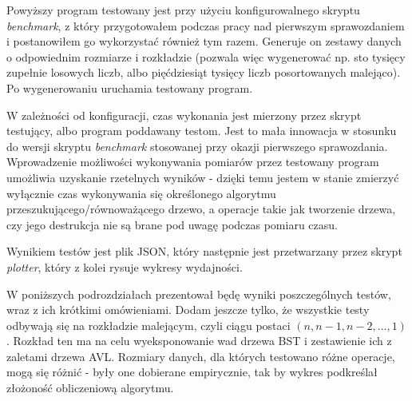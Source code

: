\documentclass[12pt]{article}
\begin{document}
        Powyższy program testowany jest przy użyciu konfigurowalnego skryptu \textit{benchmark}, z który przygotowałem podczas pracy nad pierwszym sprawozdaniem i postanowiłem go wykorzystać również tym razem. Generuje on zestawy danych o odpowiednim rozmiarze i rozkładzie (pozwala więc wygenerować np. sto tysięcy zupełnie losowych liczb, albo pięćdziesiąt tysięcy liczb posortowanych malejąco). Po wygenerowaniu uruchamia testowany program.
        
        W zależności od konfiguracji, czas wykonania jest mierzony przez skrypt testujący, albo program poddawany testom. Jest to mała innowacja w stosunku do wersji skryptu \textit{benchmark} stosowanej przy okazji pierwszego sprawozdania. Wprowadzenie możliwości wykonywania pomiarów przez testowany program umożliwia uzyskanie rzetelnych wyników - dzięki temu jestem w stanie zmierzyć wyłącznie czas wykonywania się określonego algorytmu przeszukującego/równoważącego drzewo, a operacje takie jak tworzenie drzewa, czy jego destrukcja nie są brane pod uwagę podczas pomiaru czasu.
        
        Wynikiem testów jest plik JSON, który następnie jest przetwarzany przez skrypt \textit{plotter}, który z kolei rysuje wykresy wydajności.
        
        W poniższych podrozdziałach prezentował będę wyniki poszczególnych testów, wraz z ich krótkimi omówieniami. Dodam jeszcze tylko, że wszystkie testy odbywają się na rozkładzie malejącym, czyli ciągu postaci $(n, n-1, n-2,..., 1)$. Rozkład ten ma na celu wyeksponowanie wad drzewa BST i zestawienie ich z zaletami drzewa AVL. Rozmiary danych, dla których testowano różne operacje, mogą się różnić - były one dobierane empirycznie, tak by wykres podkreślał złożoność obliczeniową algorytmu.
        \newpage
        
\end{document}

